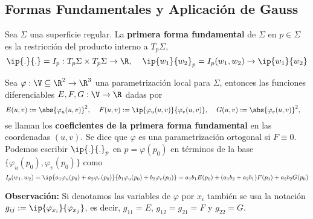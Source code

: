 \documentclass{article}
\begin{document}
\subsection{Formas Fundamentales y Aplicación de Gauss}
\begin{dfn}
    Sea $\Sigma$ una superficie regular. La \textbf{primera forma fundamental} de $\Sigma$ en 
    $p\in\Sigma$ es la restricción del producto interno a $T_{p}\Sigma$,
    \begin{equation*}
        \ip{.}{.}=I_{p}:T_{p}\Sigma\times T_{p}\Sigma\to\R,\hspace{4mm}
        \ip{w_{1}}{w_{2}}_{p}=I_{p}(w_{1},w_{2})\to\ip{w_{1}}{w_{2}}
    \end{equation*}
\end{dfn}

\noindent Sea $\varphi:\V\subseteq\R^{2}\to\R^{3}$ una parametrización local para $\Sigma$, 
entonces las funciones diferenciables $E,F,G:\V\to\R$ dadas por
\begin{equation*}
    E(u,v):=\abs{\varphi_{u}(u,v)}^{2},\hspace{4mm}
    F(u,v):=\ip{\varphi_{u}(u,v)}{\varphi_{v}(u,v)},\hspace{4mm}
    G(u,v):=\abs{\varphi_{v}(u,v)}^{2},\hspace{4mm}
\end{equation*}
se llaman los \textbf{coeficientes de la primera forma fundamental} en las coordenadas $(u,v)$. Se
dice que $\varphi$ es una parametrización ortogonal si $F\equiv0$. Podemos escribir $\ip{.}{.}_{p}$
en $p=\varphi(p_{0})$ en términos de la base $\{\varphi_{u}(p_{0}),\varphi_{v}(p_{0})\}$ como
\begin{equation*}
    I_{p}(w_{1},w_{2})=\ip{a_{1}\varphi_{u}(p_{0})+a_{2}\varphi_{v}(p_{0})}
    {b_{1}\varphi_{u}(p_{0})+b_{2}\varphi_{v}(p_{0})} = a_{1}b_{1}E(p_{0})+
    (a_{1}b_{2}+a_{2}b_{1})F(p_{0})+a_{2}b_{2}G(p_{0})
\end{equation*}

\vspace{4mm}
\noindent\textbf{Observación:} Si denotamos las variables de $\varphi$ por $x_{i}$ también se usa
la notación $g_{ij}:=\ip{\varphi_{x_{i}}}{\varphi_{x_{j}}}$, es decir, $g_{11}=E$, $g_{12}=g_{21}=F$
y $g_{22}=G$.
\end{document}
